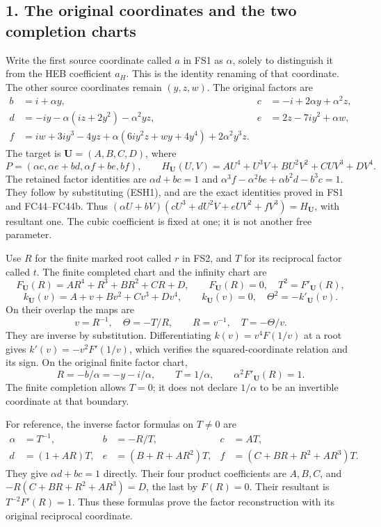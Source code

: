 \documentclass[
  10pt,
  a4paper,
]{article}
\begin{document}
\subsection{1. The original coordinates and the two completion
charts}\label{the-original-coordinates-and-the-two-completion-charts}

Write the first source coordinate called \(a\) in FS1 as \(\alpha\),
solely to distinguish it from the HEB coefficient \(a_H\). This is the
identity renaming of that coordinate. The other source coordinates
remain \((y,z,w)\). The original factors are \[
\begin{aligned}
b&=i+\alpha y,&c&=-i+2\alpha y+\alpha^2z,\\
d&=-iy-\alpha(iz+2y^2)-\alpha^2yz,&
e&=2z-7iy^2+\alpha w,\\
f&=iw+3iy^3-4yz+\alpha(6iy^2z+wy+4y^4)+2\alpha^2y^3z.
\end{aligned}
\tag{ESH1}
\] The target is \(\mathbf U=(A,B,C,D)\), where \[
P=(\alpha c,\alpha e+bd,\alpha f+be,bf),\qquad
H_{\mathbf U}(U,V)=AU^4+U^3V+BU^2V^2+CUV^3+DV^4.
\tag{ESH2}
\] The retained factor identities are \(\alpha d+bc=1\) and
\(\alpha^3f-\alpha^2be+\alpha b^2d-b^3c=1\). They follow by substituting
(ESH1), and are the exact identities proved in FS1 and FC44--FC44b. Thus
\((\alpha U+bV)(cU^3+dU^2V+eUV^2+fV^3)=H_{\mathbf U}\), with resultant
one. The cubic coefficient is fixed at one; it is not another free
parameter.

Use \(R\) for the finite marked root called \(r\) in FS2, and \(T\) for
its reciprocal factor called \(t\). The finite completed chart and the
infinity chart are \[
F_{\mathbf U}(R)=AR^4+R^3+BR^2+CR+D,
\qquad F_{\mathbf U}(R)=0,\quad T^2=F'_{\mathbf U}(R),
\tag{ESH3}
\] \[
k_{\mathbf U}(v)=A+v+Bv^2+Cv^3+Dv^4,
\qquad k_{\mathbf U}(v)=0,\quad \Theta^2=-k'_{\mathbf U}(v).
\tag{ESH4}
\] On their overlap the maps are \[
v=R^{-1},\quad \Theta=-T/R,\qquad
R=v^{-1},\quad T=-\Theta/v.
\tag{ESH5}
\] They are inverse by substitution. Differentiating \(k(v)=v^4F(1/v)\)
at a root gives \(k'(v)=-v^2F'(1/v)\), which verifies the
squared-coordinate relation and its sign. On the original finite factor
chart, \[
R=-b/\alpha=-y-i/\alpha,\qquad T=1/\alpha,
\qquad \alpha^2F'_{\mathbf U}(R)=1.
\tag{ESH6}
\] The finite completion allows \(T=0\); it does not declare
\(1/\alpha\) to be an invertible coordinate at that boundary.

For reference, the inverse factor formulas on \(T\ne0\) are \[
\begin{aligned}
\alpha&=T^{-1},&b&=-R/T,&c&=AT,\\
d&=(1+AR)T,&e&=(B+R+AR^2)T,&
f&=(C+BR+R^2+AR^3)T.
\end{aligned}
\tag{ESH7}
\] They give \(\alpha d+bc=1\) directly. Their four product coefficients
are \(A,B,C\), and \(-R(C+BR+R^2+AR^3)=D\), the last by \(F(R)=0\).
Their resultant is \(T^{-2}F'(R)=1\). Thus these formulas prove the
factor reconstruction with its original reciprocal coordinate.
\end{document}
